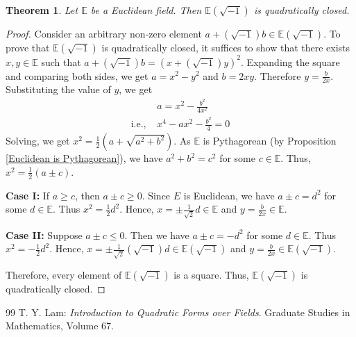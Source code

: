 \documentclass[10pt,a4paper]{amsart}
\newtheorem{theorem}{Theorem}
\begin{document}
\begin{theorem}\label{Euclidean is quad closed}
    Let $\mathbb E$ be a Euclidean field. Then $\mathbb E(\sqrt{-1})$ is quadratically closed. 
\end{theorem}

\begin{proof}
    Consider an arbitrary non-zero element $a+(\sqrt{-1})b \in \mathbb E(\sqrt{-1})$. To prove that $\mathbb E(\sqrt{-1})$ is quadratically closed, it suffices to show that there exists $x,y \in \mathbb E$ such that  $a+(\sqrt{-1})b=(x+(\sqrt{-1})y)^2$. Expanding the square and comparing both sides, we get $a=x^2-y^2$ and $b=2xy$. Therefore $y=\frac{b}{2x}$. Substituting the value of $y$, we get
\begin{align*}
    & a=x^2- \frac{b^2}{4x^2}\\ 
     \text{i.e., } &x^4-ax^2-\frac{b^2}{4}=0
\end{align*}
    Solving, we get $x^2=\frac{1}{2}(a+\sqrt{a^2+b^2})$. As $\mathbb E$ is Pythagorean (by Proposition \ref{Euclidean is Pythagorean}), we have $a^2+b^2=c^2$ for some $c \in \mathbb E$. Thus, $x^2=\frac{1}{2}(a \pm c)$. 
    \medskip 
    
    \textbf{Case I:} If $a\geq c$, then $a \pm c \geq 0$. Since $E$ is Euclidean, we have $a \pm c =d^2$ for some $d \in \mathbb E$. Thus $x^2=\frac{1}{2}d^2$. Hence, $x= \pm \frac{1}{\sqrt{2}}d \in \mathbb E$ and $y=\frac{b}{2x} \in \mathbb E$.
\medskip 

    \textbf{Case II:} Suppose $a \pm c \leq 0$. Then we have $a \pm c = -d^2$ for some $d \in \mathbb E$. Thus  $x^2=-\frac{1}{2}d^2$. Hence, $x= \pm \frac{1}{\sqrt{2}}(\sqrt{-1})d \in \mathbb E(\sqrt{-1})$ and $y=\frac{b}{2x} \in \mathbb E(\sqrt{-1})$.
    
    Therefore, every element of $\mathbb E(\sqrt{-1})$ is a square. Thus, $\mathbb E(\sqrt{-1})$ is quadratically closed.
\end{proof}

\begin{thebibliography}{99}
 T. Y. Lam: \textit{Introduction to Quadratic Forms over Fields}. Graduate Studies in Mathematics, Volume 67.
\end{thebibliography}
\end{document}
